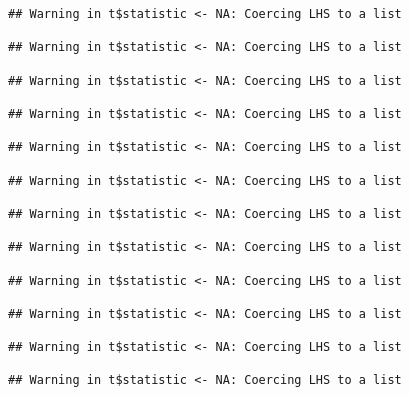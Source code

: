 \documentclass[
]{article}
\newenvironment{Shaded}{\begin{snugshade}}{\end{snugshade}}
\newcommand{\KeywordTok}[1]{\textcolor[rgb]{0.13,0.29,0.53}{\textbf{#1}}}
\newcommand{\NormalTok}[1]{#1}
\newcommand{\OperatorTok}[1]{\textcolor[rgb]{0.81,0.36,0.00}{\textbf{#1}}}
\newcommand{\StringTok}[1]{\textcolor[rgb]{0.31,0.60,0.02}{#1}}
\begin{document}
\begin{verbatim}
## Warning in t$statistic <- NA: Coercing LHS to a list

## Warning in t$statistic <- NA: Coercing LHS to a list

## Warning in t$statistic <- NA: Coercing LHS to a list

## Warning in t$statistic <- NA: Coercing LHS to a list

## Warning in t$statistic <- NA: Coercing LHS to a list

## Warning in t$statistic <- NA: Coercing LHS to a list

## Warning in t$statistic <- NA: Coercing LHS to a list

## Warning in t$statistic <- NA: Coercing LHS to a list

## Warning in t$statistic <- NA: Coercing LHS to a list

## Warning in t$statistic <- NA: Coercing LHS to a list

## Warning in t$statistic <- NA: Coercing LHS to a list

## Warning in t$statistic <- NA: Coercing LHS to a list
\end{verbatim}

\begin{Shaded}
\end{Shaded}
\end{document}
